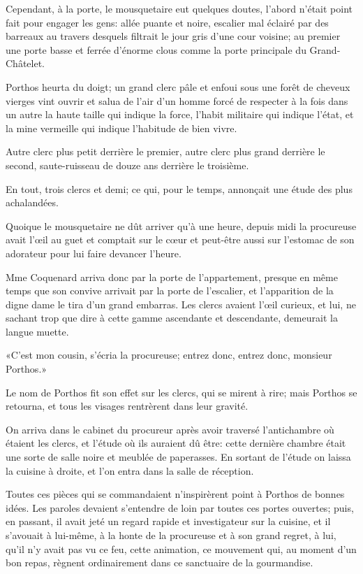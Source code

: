 Cependant, à la porte, le mousquetaire eut quelques doutes, l'abord n'était point fait pour engager les gens: allée puante et noire, escalier mal éclairé par des barreaux au travers desquels filtrait le jour gris d'une cour voisine; au premier une porte basse et ferrée d'énorme clous comme la porte principale du Grand-Châtelet. 

Porthos heurta du doigt; un grand clerc pâle et enfoui sous une forêt de cheveux vierges vint ouvrir et salua de l'air d'un homme forcé de respecter à la fois dans un autre la haute taille qui indique la force, l'habit militaire qui indique l'état, et la mine vermeille qui indique l'habitude de bien vivre. 

Autre clerc plus petit derrière le premier, autre clerc plus grand derrière le second, saute-ruisseau de douze ans derrière le troisième. 

En tout, trois clercs et demi; ce qui, pour le temps, annonçait une étude des plus achalandées. 

Quoique le mousquetaire ne dût arriver qu'à une heure, depuis midi la procureuse avait l'œil au guet et comptait sur le cœur et peut-être aussi sur l'estomac de son adorateur pour lui faire devancer l'heure. 

Mme Coquenard arriva donc par la porte de l'appartement, presque en même temps que son convive arrivait par la porte de l'escalier, et l'apparition de la digne dame le tira d'un grand embarras. Les clercs avaient l'œil curieux, et lui, ne sachant trop que dire à cette gamme ascendante et descendante, demeurait la langue muette. 

«C'est mon cousin, s'écria la procureuse; entrez donc, entrez donc, monsieur Porthos.» 

Le nom de Porthos fit son effet sur les clercs, qui se mirent à rire; mais Porthos se retourna, et tous les visages rentrèrent dans leur gravité. 

On arriva dans le cabinet du procureur après avoir traversé l'antichambre où étaient les clercs, et l'étude où ils auraient dû être: cette dernière chambre était une sorte de salle noire et meublée de paperasses. En sortant de l'étude on laissa la cuisine à droite, et l'on entra dans la salle de réception. 

Toutes ces pièces qui se commandaient n'inspirèrent point à Porthos de bonnes idées. Les paroles devaient s'entendre de loin par toutes ces portes ouvertes; puis, en passant, il avait jeté un regard rapide et investigateur sur la cuisine, et il s'avouait à lui-même, à la honte de la procureuse et à son grand regret, à lui, qu'il n'y avait pas vu ce feu, cette animation, ce mouvement qui, au moment d'un bon repas, règnent ordinairement dans ce sanctuaire de la gourmandise. 

